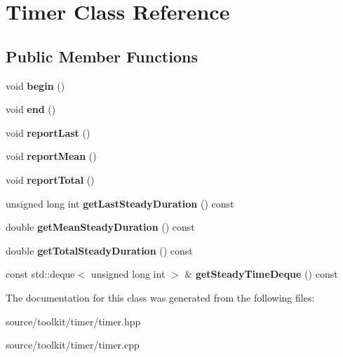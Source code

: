 \hypertarget{classTimer}{}\section{Timer Class Reference}
\label{classTimer}
\subsection*{Public Member Functions}
\begin{DoxyCompactItemize}
\item 
\mbox{\label{classTimer_a4359ac544d52c5811bc94a9b786b8ebd}} 
void {\bfseries begin} ()
\item 
\mbox{\label{classTimer_accef2f2b25869fbca2947a56b494d2a0}} 
void {\bfseries end} ()
\item 
\mbox{\label{classTimer_a91f8343477c3ee08cbc9a1e7d380ce85}} 
void {\bfseries report\+Last} ()
\item 
\mbox{\label{classTimer_aba1ae9f5e81bab598e5b2e749f29ec84}} 
void {\bfseries report\+Mean} ()
\item 
\mbox{\label{classTimer_a0b8c78152f7a219b1d6bade590e59685}} 
void {\bfseries report\+Total} ()
\item 
\mbox{\label{classTimer_a105b25e3601c7380cddd0256830342a4}} 
unsigned long int {\bfseries get\+Last\+Steady\+Duration} () const
\item 
\mbox{\label{classTimer_a5ae2404ac1230691e2867567f76f5c9e}} 
double {\bfseries get\+Mean\+Steady\+Duration} () const
\item 
\mbox{\label{classTimer_af7f3d912ea8d64349ef6062beec0774b}} 
double {\bfseries get\+Total\+Steady\+Duration} () const
\item 
\mbox{\label{classTimer_ad0e0d360e7273f7375e43a1d6eab6275}} 
const std\+::deque$<$ unsigned long int $>$ \& {\bfseries get\+Steady\+Time\+Deque} () const
\end{DoxyCompactItemize}


The documentation for this class was generated from the following files\+:\begin{DoxyCompactItemize}
\item 
source/toolkit/timer/timer.\+hpp\item 
source/toolkit/timer/timer.\+cpp\end{DoxyCompactItemize}
